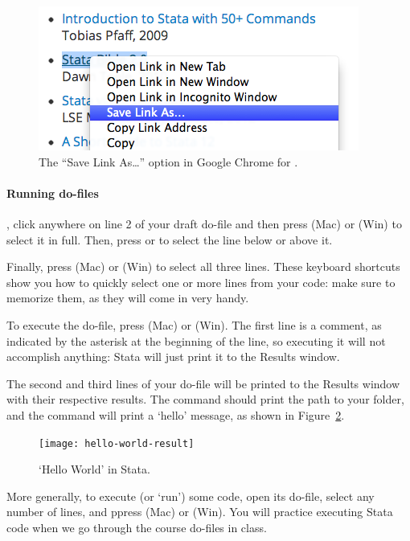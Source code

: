 \begin{figure}
  \includegraphics[scale=.5]{images/macosx-save-as.png}
  \caption{The ``Save Link As…'' option in Google Chrome for \OSX.}
  \label{fig:save-as}
\end{figure}

\paragraph{Running do-files}

, click anywhere on line 2 of your draft do-file and then press  (Mac) or  (Win) to select it in full. Then, press  or  to select the line below or above it.%

Finally, press  (Mac) or  (Win) to select all three lines. These keyboard shortcuts show you how to quickly select one or more lines from your code: make sure to memorize them, as they will come in very handy.%

To execute the do-file, press  (Mac) or  (Win). The first line is a comment, as indicated by the asterisk at the beginning of the line, so executing it will not accomplish anything: Stata will just print it to the Results window.%

The second and third lines of your do-file will be printed to the Results window with their respective results. The  command should print the path to your \SRQM folder, and the  command will print a `hello' message, as shown in Figure~\ref{fig:hello-world-result}.%

\begin{figure}%
  \texttt{[image: hello-world-result]}

  \caption{`Hello World' in Stata.}
  \label{fig:hello-world-result}
\end{figure}

More generally, to execute (or `run') some code, open its do-file, select any number of lines, and ppress  (Mac) or  (Win). You will practice executing Stata code when we go through the course do-files in class.%

